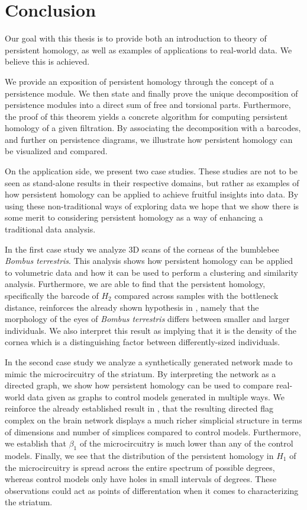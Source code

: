 \clearpage
\chapter{Conclusion}


Our goal with this thesis is to provide both an introduction to theory of persistent homology, as well as examples of applications to real-world data. We believe this is  achieved.

We provide an exposition of persistent homology through the concept of a persistence module. We then state and finally prove the unique decomposition of persistence modules into a direct sum of free and torsional parts.  Furthermore, the proof of this theorem yields a concrete algorithm for computing persistent homology of a given filtration. By associating the decomposition with a barcodes, and further on persistence diagrams, we illustrate how persistent homology can be visualized and compared.

On the application side, we present two case studies. These studies are not to be seen as stand-alone results in their respective domains, but rather as examples of how persistent homology can be applied to achieve fruitful insights into data. By using these non-traditional ways of exploring data we hope that we show there is some merit to considering persistent homology as a way of enhancing a traditional data analysis.

In the first case study we analyze 3D scans of the corneas of the bumblebee \textit{Bombus terrestris}. This analysis shows how persistent homology can be applied to volumetric data and how it can be used to perform a clustering and similarity analysis. Furthermore, we are able to find that the persistent homology, specifically the barcode of $H_{2}$ compared across samples with the bottleneck distance, reinforces the already shown hypothesis in \cite{emily}, namely that the morphology of the eyes of \textit{Bombus terrestris} differs between smaller and larger individuals. We also interpret this result as implying that it is the density of the cornea which is a distinguishing factor between differently-sized individuals.

In the second case study we analyze a synthetically generated network made to mimic the microcircuitry of the striatum. By interpreting the network as a directed graph, we show how persistent homology can be used to compare real-world data given as graphs to control models generated in multiple ways. We reinforce the already established result in \cite{reimann}, that the resulting directed flag complex on the brain network displays a much richer simplicial structure in terms of dimensions and number of simplices compared to control models. Furthermore, we establish that $\beta_{1}$ of the microcircuitry is much lower than any of the control models. Finally, we see that the distribution of the persistent homology in $H_{1}$ of the microcircuitry is spread across the entire spectrum of possible degrees, whereas control models only have holes in small intervals of degrees. These observations could act as points of differentation when it comes to characterizing the striatum.


